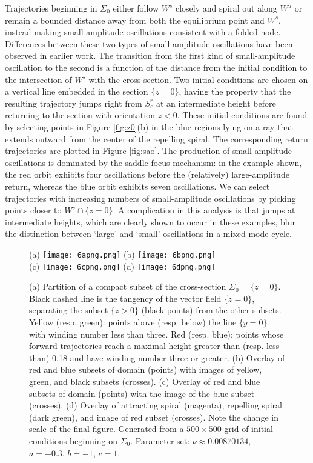 \documentclass[aip, cha, sd, amsmath,amssymb, preprint]{revtex4-1}
\begin{document}
Trajectories beginning in $\Sigma_0$ either follow $W^s$ closely and spiral out along $W^u$ or remain a bounded distance away from both the equilibrium point and $W^s$, instead making small-amplitude oscillations consistent with a folded node. Differences between these two types of small-amplitude oscillations have been observed in earlier work. The transition from the first kind of small-amplitude oscillation to the second is a function of the distance from the initial condition to the intersection of $W^s$ with the cross-section. Two initial conditions are chosen on a vertical line embedded in the section $\{z=0\}$, having the property that the resulting trajectory jumps right from $S^r_{ \varepsilon}$ at an intermediate height before returning to the section with orientation $\dot{z} < 0$. These initial conditions are found by selecting points in Figure \ref{fig:z0}(b) in the blue regions lying on a ray that extends outward from the center of the repelling spiral. The corresponding return trajectories are plotted in Figure \ref{fig:sao}. The production of small-amplitude oscillations is dominated by the saddle-focus mechanism: in the example shown, the red orbit exhibits four oscillations before the (relatively) large-amplitude return, whereas the blue orbit exhibits seven oscillations. We can select trajectories with increasing numbers of small-amplitude oscillations by picking points closer to $W^s \cap \{z=0\}$.  A complication in this analysis is that jumps at intermediate heights, which are clearly shown to occur in these examples, blur the distinction between `large' and `small' oscillations in a mixed-mode cycle. 

\begin{figure}
(a) \texttt{[image: 6apng.png]}
(b) \texttt{[image: 6bpng.png]}\\
(c) \texttt{[image: 6cpng.png]}
(d) \texttt{[image: 6dpng.png]}
\caption{\label{fig:2dmap} (a) Partition of a compact subset of the cross-section $\Sigma_0 = \{z = 0\}$. Black dashed line is the tangency of the vector field $\{\dot{z} = 0\}$, separating the subset $\{\dot{z} > 0\}$ (black points) from the other subsets. Yellow (resp. green): points above (resp. below) the line $\{y = 0\}$ with winding number less than three. Red (resp. blue): points whose forward trajectories reach a maximal height greater than (resp. less than) 0.18 and have winding number three or greater. (b) Overlay of red and blue subsets of domain (points) with images of yellow, green, and black subsets (crosses). (c) Overlay of red and blue subsets of domain (points) with the image of the blue subset (crosses). (d) Overlay of attracting spiral (magenta), repelling spiral (dark green), and image of red subset (crosses). Note the change in scale of the final figure. Generated from a $500 \times 500$ grid of initial conditions beginning on $\Sigma_0$. Parameter set: $\nu \approx 0.00870134$, $a = -0.3$, $b = -1$, $c = 1$.}
\end{figure}
\end{document}
